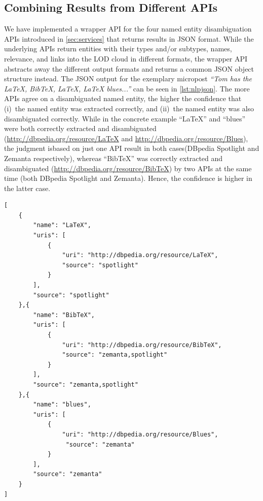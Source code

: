 \documentclass{iosart2c}
\begin{document}
\subsection{Combining Results from Different APIs} \label{sec:consolidation-nlp}
We have implemented a wrapper API for the four named entity disambiguation APIs introduced in \autoref{sec:services} that returns results in JSON format.
While the underlying APIs return entities with their types and/or subtypes, names, relevance, and links into the LOD cloud in different formats, the wrapper API abstracts away the different output formats and returns a common JSON object structure instead.
The JSON output for the exemplary micropost \textit{``Tom has the LaTeX, BibTeX, LaTeX, LaTeX blues...''} can be seen in \autoref{lst:nlpjson}.
The more APIs agree on a disambiguated named entity, the higher the confidence that (i)~the named entity was extracted correctly, and (ii)~the named entity was also disambiguated correctly.
While  in the concrete example ``LaTeX'' and ``blues'' were both correctly extracted and disambiguated (\url{http://dbpedia.org/resource/LaTeX} and \url{http://dbpedia.org/resource/Blues}), the judgment is\linebreak based on just one API result in both cases\linebreak (DBpedia Spotlight and Zemanta respectively),
whereas ``BibTeX'' was correctly extracted and disambiguated (\url{http://dbpedia.org/resource/BibTeX}) by two APIs at the same time (both DBpedia Spotlight and Zemanta).
Hence, the confidence is higher in the latter case.

\begin{lstlisting}[caption={Example JSON output of the named entity disambiguation wrapper, showing different entities and sources.},label={lst:nlpjson}]
[
    {
        "name": "LaTeX",
        "uris": [
            {
                "uri": "http://dbpedia.org/resource/LaTeX",
                "source": "spotlight"
            }
        ],
        "source": "spotlight"
    },{
        "name": "BibTeX",
        "uris": [
            {
                "uri": "http://dbpedia.org/resource/BibTeX",
                "source": "zemanta,spotlight"
            }
        ],
        "source": "zemanta,spotlight"
    },{
        "name": "blues",
        "uris": [
            {
                "uri": "http://dbpedia.org/resource/Blues",
                 "source": "zemanta"
            }
        ],
        "source": "zemanta"
    }    
]
\end{lstlisting}
\end{document}
